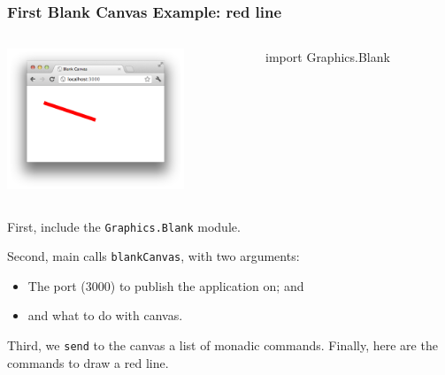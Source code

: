 \documentclass{beamer}
\begin{document}
\begin{frame}[fragile]
\frametitle{First Blank Canvas Example: red line}
\Large



\begin{columns}
\begin{column}{0.40\textwidth}
\includegraphics[width=150pt]{red-line.png}
\end{column}
\begin{column}{0.60\textwidth}
\begin{codeblock}[0.95]
\footnotesize
\begin{semiverbatim}
import Graphics.Blank
\end{semiverbatim}
\end{codeblock}
\end{column}
\end{columns}

\frameskip{}
%
{First, include the {\tt Graphics.Blank} module.\vspace{0.58in}}
%
{Second, main calls {\tt blankCanvas}, with two arguments:%
\begin{itemize}
\item The port (3000) to publish the application on; and
\item and what to do with canvas.
\end{itemize}
}
%
{Third, we {\tt send} to the canvas a list of monadic commands.\vspace{0.38in}}
%
{Finally, here are the commands to draw a {\color{red}red} line.\vspace{0.58in}}

\end{frame}
\end{document}
